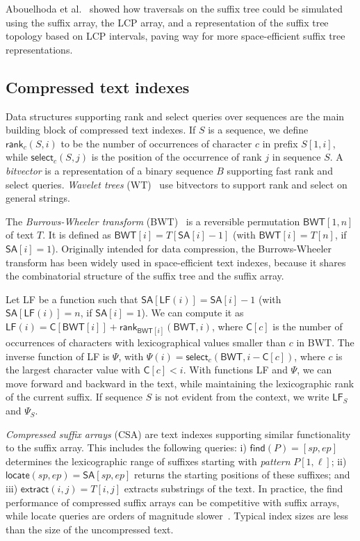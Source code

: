 \documentclass[a4paper,11pt]{llncs}
\newcommand{\SA}{\textsf{SA}}
\newcommand{\BWT}{\textsf{BWT}}
\newcommand{\CSA}{\textsf{CSA}}
\newcommand{\mSA}{\ensuremath{\mathsf{SA}}}
\newcommand{\mBWT}{\ensuremath{\mathsf{BWT}}}
\newcommand{\LCP}{\textsf{LCP}}
\newcommand{\WT}{\textsf{WT}}
\newcommand{\mC}{\ensuremath{\mathsf{C}}}
\newcommand{\LF}{\textsf{LF}}
\newcommand{\find}{\textsf{find}}
\newcommand{\locate}{\textsf{locate}}
\newcommand{\rank}{\textsf{rank}}
\newcommand{\select}{\textsf{select}}
\newcommand{\mLF}{\ensuremath{\mathsf{LF}}}
\newcommand{\mPsi}{\ensuremath{\mathsf{\Psi}}}
\newcommand{\mfind}{\ensuremath{\mathsf{find}}}
\newcommand{\mlocate}{\ensuremath{\mathsf{locate}}}
\newcommand{\mextract}{\ensuremath{\mathsf{extract}}}
\newcommand{\mrank}{\ensuremath{\mathsf{rank}}}
\newcommand{\mselect}{\ensuremath{\mathsf{select}}}
\begin{document}
Abouelhoda et al.~\cite{Abouelhoda2004} showed how traversals on the suffix tree could be simulated using the suffix array, the \LCP{} array, and a representation of the suffix tree topology based on \LCP{} intervals, paving way for more space-efficient suffix tree representations.

\subsection{Compressed text indexes}

Data structures supporting \rank{} and \select{} queries over sequences are the main building block of compressed text indexes. If $S$ is a sequence, we define $\mrank_{c}(S,i)$ to be the number of occurrences of character $c$ in prefix $S[1,i]$, while $\mselect_{c}(S,j)$ is the position of the occurrence of rank $j$ in sequence $S$. A \emph{bitvector} is a representation of a binary sequence $B$ supporting fast \rank{} and \select{} queries. \emph{Wavelet trees} (\WT)~\cite{Grossi2003} use bitvectors to support \rank{} and \select{} on general strings.

The \emph{Burrows-Wheeler transform} (\BWT)~\cite{Burrows1994} is a reversible permutation $\mBWT[1,n]$ of text $T$. It is defined as $\mBWT[i] = T[\mSA[i] - 1]$ (with $\mBWT[i] = T[n]$, if $\SA[i] = 1$). Originally intended for data compression, the Burrows-Wheeler transform has been widely used in space-efficient text indexes, because it shares the combinatorial structure of the suffix tree and the suffix array.

Let \LF{} be a function such that $\mSA[\mLF(i)] = \mSA[i] - 1$ (with $\mSA[\mLF(i)] = n$, if $\mSA[i] = 1$). We can compute it as $\mLF(i) = \mC[\mBWT[i]] + \mrank_{\mBWT[i]}(\mBWT, i)$, where $\mC[c]$ is the number of occurrences of characters with lexicographical values smaller than $c$ in \BWT. The inverse function of \LF{} is $\mPsi$, with $\mPsi(i) = \mselect_{c}(\mBWT, i - \mC[c])$, where $c$ is the largest character value with $\mC[c] < i$. With functions \LF{} and $\mPsi$, we can move forward and backward in the text, while maintaining the lexicographic rank of the current suffix. If sequence $S$ is not evident from the context, we write $\mLF_{S}$ and $\mPsi_{S}$.

\emph{Compressed suffix arrays} (\CSA) \cite{Ferragina2005a,Grossi2005} are text indexes supporting similar functionality to the suffix array. This includes the following queries: i) $\mfind(P) = [sp,ep]$ determines the lexicographic range of suffixes starting with \emph{pattern} $P[1,\ell]$; ii) $\mlocate(sp,ep) = \mSA[sp,ep]$ returns the starting positions of these suffixes; and iii) $\mextract(i,j) = T[i,j]$ extracts substrings of the text. In practice, the \find{} performance of compressed suffix arrays can be competitive with suffix arrays, while \locate{} queries are orders of magnitude slower~\cite{Ferragina2009a}. Typical index sizes are less than the size of the uncompressed text.
\end{document}
